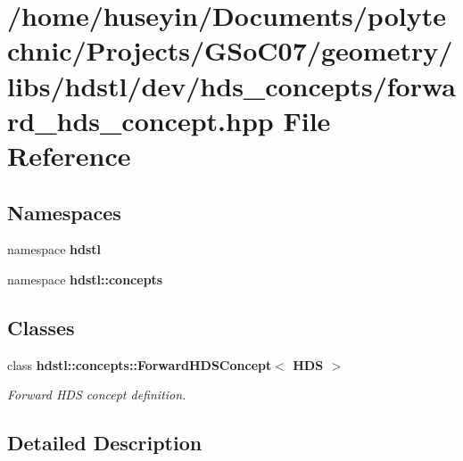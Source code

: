 \section{/home/huseyin/Documents/polytechnic/Projects/GSo\-C07/geometry/libs/hdstl/dev/hds\_\-concepts/forward\_\-hds\_\-concept.hpp File Reference}
\label{forward__hds__concept_8hpp}
\subsection*{Namespaces}
\begin{CompactItemize}
\item 
namespace \textbf{hdstl}
\item 
namespace \textbf{hdstl::concepts}
\end{CompactItemize}
\subsection*{Classes}
\begin{CompactItemize}
\item 
class \bf{hdstl::concepts::Forward\-HDSConcept$<$ HDS $>$}
\begin{CompactList}\small\item\em Forward HDS concept definition. \item\end{CompactList}\end{CompactItemize}


\subsection{Detailed Description}
